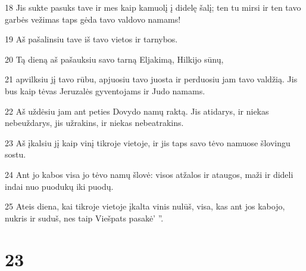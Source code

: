\par 18 Jis sukte pasuks tave ir mes kaip kamuolį į didelę šalį; ten tu mirsi ir ten tavo garbės vežimas taps gėda tavo valdovo namams! 
\par 19 Aš pašalinsiu tave iš tavo vietos ir tarnybos. 
\par 20 Tą dieną aš pašauksiu savo tarną Eljakimą, Hilkijo sūnų, 
\par 21 apvilksiu jį tavo rūbu, apjuosiu tavo juosta ir perduosiu jam tavo valdžią. Jis bus kaip tėvas Jeruzalės gyventojams ir Judo namams. 
\par 22 Aš uždėsiu jam ant peties Dovydo namų raktą. Jis atidarys, ir niekas nebeuždarys, jis užrakins, ir niekas nebeatrakins. 
\par 23 Aš įkalsiu jį kaip vinį tikroje vietoje, ir jis taps savo tėvo namuose šlovingu sostu. 
\par 24 Ant jo kabos visa jo tėvo namų šlovė: visos atžalos ir ataugos, maži ir dideli indai nuo puodukų iki puodų. 
\par 25 Ateis diena, kai tikroje vietoje įkalta vinis nulūš, visa, kas ant jos kabojo, nukris ir suduš, nes taip Viešpats pasakė’ ”.



\chapter{23}


